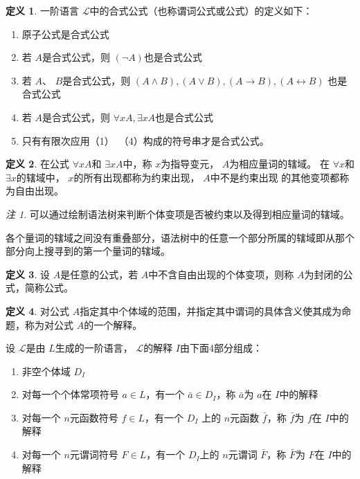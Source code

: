 \documentclass[a4paper,11pt]{article}%
\theoremstyle{remark}
\newtheorem*{remark}{注}
\theoremstyle{remark}
\theoremstyle{definition}
\theoremstyle{definition}
\newtheorem*{definition}{定义}
\theoremstyle{plain}
\begin{document}
\begin{definition}
    一阶语言 $\mathcal{L}$中的合式公式（也称谓词公式或公式）的定义如下：
    \begin{enumerate}
        \item 原子公式是合式公式
        \item 若 $A$是合式公式，则 $(\lnot A)$也是合式公式
        \item 若 $A$、 $B$是合式公式，则 $(A\land B),(A\lor B),(A\rightarrow B),(A\leftrightarrow B)$
        也是合式公式
        \item 若 $A$是合式公式，则 $\forall xA,\exists xA$也是合式公式
        \item 只有有限次应用（1）~（4）构成的符号串才是合式公式。
    \end{enumerate}
\end{definition}
\begin{definition}
    在公式 $\forall xA$和 $\exists xA$中，称 $x$为指导变元， $A$为相应量词的辖域。
    在 $\forall x$和 $\exists x$的辖域中， $x$的所有出现都称为约束出现， $A$中不是约束出现
    的其他变项都称为自由出现。
\end{definition}
\begin{remark}
    可以通过绘制语法树来判断个体变项是否被约束以及得到相应量词的辖域。

    各个量词的辖域之间没有重叠部分，语法树中的任意一个部分所属的辖域即从那个部分向上搜寻到的第一个量词的辖域。
\end{remark}
\begin{definition}
    设 $A$是任意的公式，若 $A$中不含自由出现的个体变项，则称 $A$为封闭的公式，简称公式。
\end{definition}
\begin{definition}
    对公式 $A$指定其中个体域的范围，并指定其中谓词的具体含义使其成为命题，称为对公式 $A$的一个解释。

    设 $\mathcal{L}$是由 $L$生成的一阶语言， $\mathcal{L}$的解释 $I$由下面4部分组成：
    \begin{enumerate}
        \item 非空个体域 $D_I$
        \item 对每一个个体常项符号 $a\in L$，有一个 $\bar{a}\in D_I$，称 $\bar{a}$为 $a$在 $I$中的解释
        \item 对每一个 $n$元函数符号 $f\in L$，有一个 $D_I$ 上的 $n$元函数 $\bar{f}$，称 $\bar{f}$为 $f$在 $I$中的解释
        \item 对每一个 $n$元谓词符号 $F\in L$，有一个 $D_I$上的 $n$元谓词 $\bar{F}$，称 $\bar{F}$为 $F$在 $I$中的解释
    \end{enumerate}
\end{definition}
\end{document}
